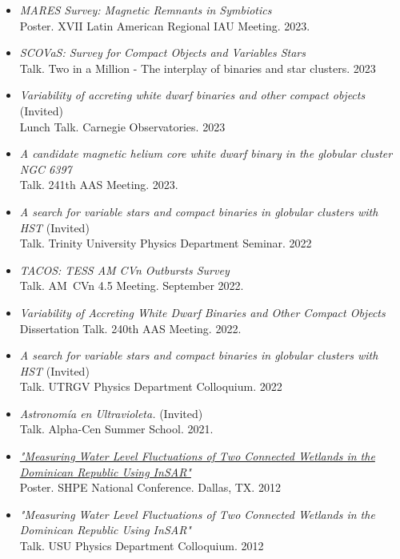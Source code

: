 \documentclass[letterpaper,10pt]{article}
\begin{document}
\begin{itemize}[label=$\blacktriangleright$]


\item \textit{MARES Survey: Magnetic Remnants in Symbiotics} \\ Poster. XVII Latin American Regional IAU Meeting. 2023.

\item \textit{ SCOVaS: Survey for Compact Objects and Variables Stars}  \\ Talk. Two in a Million - The interplay of binaries and star clusters. 2023



\item \textit{ Variability of accreting white dwarf binaries and other compact objects }  (Invited) \\ Lunch Talk. Carnegie Observatories. 2023

\item \textit{A candidate magnetic helium core white dwarf binary in the globular cluster NGC 6397} \\ Talk. 241th AAS Meeting. 2023.

\item \emph{A search for variable stars and compact binaries in globular clusters with HST} (Invited)\\
Talk. Trinity University Physics Department Seminar. 2022

\item \textit{TACOS: TESS AM CVn Outbursts Survey} \\ Talk. AM~CVn 4.5 Meeting. September 2022.

\item \textit{Variability of Accreting White Dwarf Binaries and Other Compact Objects} \\ Dissertation Talk. 240th AAS Meeting. 2022.


\item \emph{A search for variable stars and compact binaries in globular clusters with HST} (Invited)\\
Talk. UTRGV Physics Department Colloquium. 2022


\item \textit{Astronom\'ia en Ultravioleta.} (Invited)\\ Talk. Alpha-Cen Summer School. 2021.




\item \textit{\href{http://manuelpm.me/papers/posterinsar.pdf}{"Measuring Water Level Fluctuations of Two Connected Wetlands in the Dominican Republic Using InSAR"}} \\Poster. SHPE National Conference. Dallas, TX. 2012

\item \emph{"Measuring Water Level Fluctuations of Two Connected Wetlands in the Dominican Republic Using InSAR"}\\
Talk. USU Physics Department Colloquium. 2012
\end{itemize}
\end{document}
